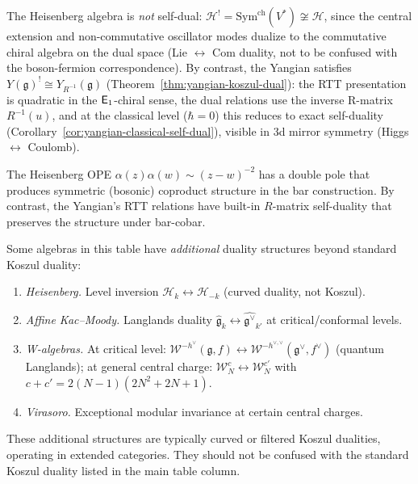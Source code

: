 \begin{remark}\label{rem:heisenberg-yangian-contrast}
The Heisenberg algebra is \emph{not} self-dual: $\mathcal{H}^! = \mathrm{Sym}^{\mathrm{ch}}(V^*) \not\cong \mathcal{H}$, since the central extension and non-commutative oscillator modes dualize to the commutative chiral algebra on the dual space (Lie $\leftrightarrow$ Com duality, not to be confused with the boson-fermion correspondence).  By contrast, the Yangian satisfies $Y(\mathfrak{g})^! \cong Y_{R^{-1}}(\mathfrak{g})$ (Theorem~\ref{thm:yangian-koszul-dual}): the RTT presentation is quadratic in the $\mathsf{E}_1$-chiral sense, the dual relations use the inverse R-matrix $R^{-1}(u)$, and at the classical level ($\hbar = 0$) this reduces to exact self-duality (Corollary~\ref{cor:yangian-classical-self-dual}), visible in 3d mirror symmetry (Higgs $\leftrightarrow$ Coulomb).

The Heisenberg OPE $\alpha(z)\alpha(w) \sim (z-w)^{-2}$ has a double pole that produces symmetric (bosonic) coproduct structure in the bar construction. By contrast, the Yangian's RTT relations have built-in $R$-matrix self-duality that preserves the structure under bar-cobar.
\end{remark}

\begin{remark}\label{rem:additional-dualities}
Some algebras in this table have \emph{additional} duality structures beyond standard Koszul duality:

\begin{enumerate}
\item \emph{Heisenberg.} Level inversion $\mathcal{H}_k \leftrightarrow \mathcal{H}_{-k}$ (curved duality, not Koszul).

\item \emph{Affine Kac--Moody.} Langlands duality $\widehat{\mathfrak{g}}_k \leftrightarrow \widehat{\mathfrak{g}^\vee}_{k'}$ at critical/conformal levels.

\item \emph{W-algebras.} At critical level: $\mathcal{W}^{-h^\vee}(\mathfrak{g}, f) \leftrightarrow \mathcal{W}^{-h^{\vee,\vee}}(\mathfrak{g}^\vee, f^\vee)$ (quantum Langlands); at general central charge: $\mathcal{W}_N^c \leftrightarrow \mathcal{W}_N^{c'}$ with $c + c' = 2(N-1)(2N^2+2N+1)$.

\item \emph{Virasoro.} Exceptional modular invariance at certain central charges.
\end{enumerate}

These additional structures are typically curved or filtered Koszul dualities, operating in extended categories. They should not be confused with the standard Koszul duality listed in the main table column.
\end{remark}

